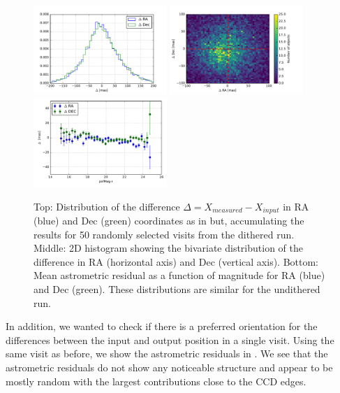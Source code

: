 \documentclass[twocolumn]{aastex62}
\begin{document}
\begin{figure}
  \centering
  \includegraphics[width=0.45\textwidth]{astrometry_imsim_dithered_50visits}
  \includegraphics[width=0.45\textwidth]{astrometry_imsim_dithered_50visits_hist2d}
  \includegraphics[width=0.45\textwidth]{astrometry_vs_mag_imsim_50_visits}
  \caption{Top: Distribution of the difference $\Delta=X_{measured}-X_{input}$ in RA (blue) and Dec (green) coordinates as in
   but, accumulating the results for 50 randomly selected visits from the dithered run. Middle: 2D histogram
  showing the bivariate distribution of the difference in RA (horizontal axis) and Dec (vertical axis). Bottom: Mean astrometric residual
  as a function of magnitude for RA (blue) and Dec (green). These distributions are similar for the undithered run.}
  \label{fig:astrometry_b}
\end{figure}

In addition, we wanted to check if there is a preferred orientation for the differences between the input and output position in a single visit. Using the same visit as before, we show the astrometric residuals in . We see that the astrometric residuals do not show any noticeable structure and appear to be mostly random with the largest contributions close to the CCD edges.
\end{document}
